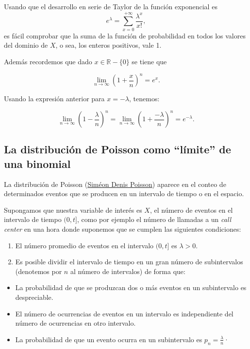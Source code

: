 \documentclass[
  letterpaper,
  DIV=11,
  numbers=noendperiod]{scrreprt}
\providecommand{\tightlist}{%
  \setlength{\itemsep}{0pt}\setlength{\parskip}{0pt}}\usepackage{longtable,booktabs,array}
\begin{document}
Usando que el desarrollo en serie de Taylor de la función exponencial es
\[
e^{\lambda}=\sum_{x=0}^{+\infty} \frac{\lambda^x}{x!},
\] es fácil comprobar que la suma de la función de probabilidad en todos
los valores del dominio de \(X\), o sea, los enteros positivos, vale 1.

Además recordemos que dado \(x\in\mathbb{R}-\{0\}\) se tiene que

\[
\lim_{n\to\infty} \left(1+\frac{x}{n}\right)^n=e^x.
\]

Usando la expresión anterior para \(x=-\lambda\), tenemos:

\[
\lim_{n\to\infty} \left(1-\frac{\lambda}{n}\right)^n=\lim_{n\to\infty} 
\left(1+\frac{-\lambda}{n}\right)^n=e^{-\lambda}.
\]

\subsection{La distribución de Poisson como ``límite'' de una
binomial}\label{la-distribuciuxf3n-de-poisson-como-luxedmite-de-una-binomial}

La distribución de Poisson
(\href{https://es.wikipedia.org/wiki/Sim\%C3\%A9on_Denis_Poisson}{Siméon
Denis Poisson}) aparece en el conteo de determinados eventos que se
producen en un intervalo de tiempo o en el espacio.

Supongamos que nuestra variable de interés es \(X\), el número de
eventos en el intervalo de tiempo \((0,t]\), como por ejemplo el número
de llamadas a un \emph{call center} en una hora donde suponemos que se
cumplen las siguientes condiciones:

\begin{enumerate}
\def\labelenumi{\arabic{enumi}.}
\tightlist
\item
  El número promedio de eventos en el intervalo \((0,t]\) es
  \(\lambda>0\).
\item
  Es posible dividir el intervalo de tiempo en un gran número de
  subintervalos (denotemos por \(n\) al número de intervalos) de forma
  que:
\end{enumerate}

\begin{itemize}
\tightlist
\item
  La probabilidad de que se produzcan dos o más eventos en un
  subintervalo es despreciable.
\item
  El número de ocurrencias de eventos en un intervalo es independiente
  del número de ocurrencias en otro intervalo.
\item
  La probabilidad de que un evento ocurra en un subintervalo es
  \(p_n=\frac{\lambda}{n}\)·
\end{itemize}
\end{document}
